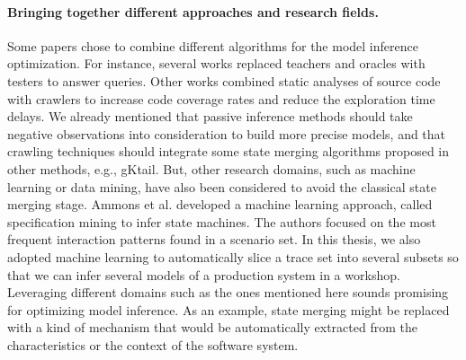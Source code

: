 \paragraph{Bringing together different approaches and research
fields.} Some papers chose to combine different algorithms for
the model inference optimization. For instance, several works
\cite{Alur:2005:SIS:1047659.1040314,Raffelt:2005:LLA:1081180.1081189,ngll11}
replaced teachers and oracles with testers to answer queries.
Other works \cite{Azim13,WPX13} combined static analyses of
source code with crawlers to increase code coverage rates and
reduce the exploration time delays. We already mentioned that
passive inference methods should take negative observations into
consideration to build more precise models, and that crawling
techniques should integrate some state merging algorithms
proposed in other methods, e.g., gKtail. But, other research
domains, such as machine learning or data mining, have also been
considered to avoid the classical state merging stage.  Ammons et
al. \cite{Ammons:2002:MS:565816.503275} developed a machine
learning approach, called specification mining to infer state
machines. The authors focused on the most frequent interaction
patterns found in a scenario set. In this thesis, we also adopted
machine learning to automatically slice a trace set into several
subsets so that we can infer several models of a production
system in a workshop. Leveraging different domains such as the
ones mentioned here sounds promising for optimizing model
inference. As an example, state merging might be replaced with a
kind of mechanism that would be automatically extracted from the
characteristics or the context of the software system.
